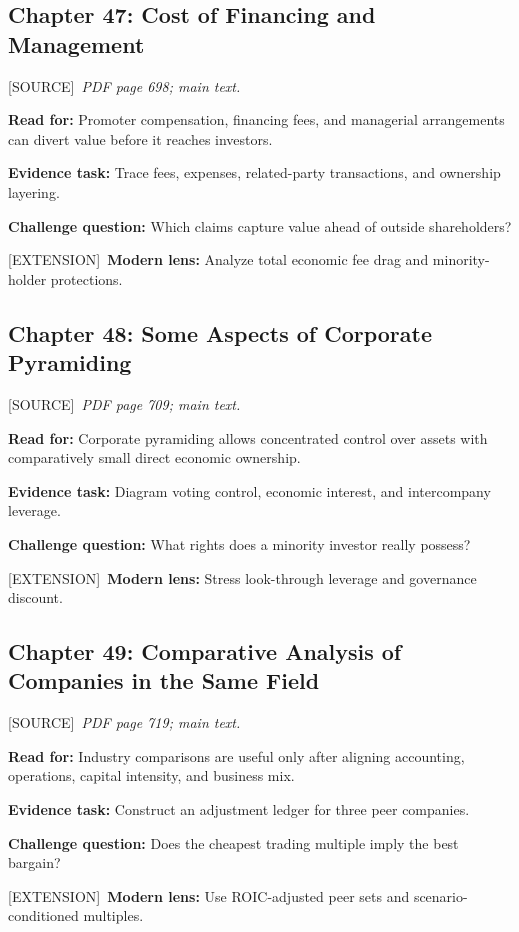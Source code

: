 \documentclass[11pt,letterpaper]{article}
\newcommand{\src}{\textsf{\color{sea}[SOURCE]}}
\newcommand{\ext}{\textsf{\color{gold}[EXTENSION]}}
\begin{document}
\subsection{Chapter 47: Cost of Financing and Management}
\src\ \textit{PDF page 698; main text.}\par
\textbf{Read for:} Promoter compensation, financing fees, and managerial arrangements can divert value before it reaches investors.\par
\textbf{Evidence task:} Trace fees, expenses, related-party transactions, and ownership layering.\par
\textbf{Challenge question:} Which claims capture value ahead of outside shareholders?\par
\ext\ \textbf{Modern lens:} Analyze total economic fee drag and minority-holder protections.\par

\subsection{Chapter 48: Some Aspects of Corporate Pyramiding}
\src\ \textit{PDF page 709; main text.}\par
\textbf{Read for:} Corporate pyramiding allows concentrated control over assets with comparatively small direct economic ownership.\par
\textbf{Evidence task:} Diagram voting control, economic interest, and intercompany leverage.\par
\textbf{Challenge question:} What rights does a minority investor really possess?\par
\ext\ \textbf{Modern lens:} Stress look-through leverage and governance discount.\par

\subsection{Chapter 49: Comparative Analysis of Companies in the Same Field}
\src\ \textit{PDF page 719; main text.}\par
\textbf{Read for:} Industry comparisons are useful only after aligning accounting, operations, capital intensity, and business mix.\par
\textbf{Evidence task:} Construct an adjustment ledger for three peer companies.\par
\textbf{Challenge question:} Does the cheapest trading multiple imply the best bargain?\par
\ext\ \textbf{Modern lens:} Use ROIC-adjusted peer sets and scenario-conditioned multiples.\par
\end{document}
